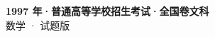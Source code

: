 \documentclass[zihao=-4, a4paper]{ctexart}
\begin{document}
\begin{center}
  {\Large\bfseries 1997 年·普通高等学校招生考试·全国卷文科}\\[4pt]
  {\large 数学 · 试题版}
\end{center}
\medskip
{}

\end{document}
